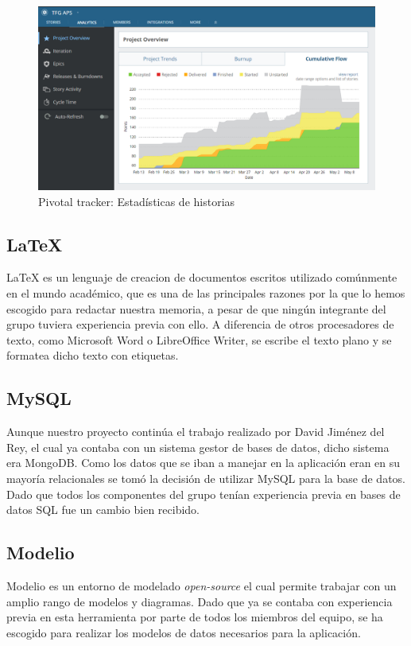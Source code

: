 \documentclass[11pt]{article}
\begin{document}
	\begin{figure}
	\centering
	\includegraphics[scale=0.6]{pivotal}
	\caption{Pivotal tracker: Estadísticas de historias}
	\label{Figura 2}
	\end{figure}
	
	\subsection{LaTeX}
LaTeX es un lenguaje de creacion de documentos escritos utilizado comúnmente en el mundo académico, que es una de las principales razones por la que lo hemos escogido para redactar nuestra memoria, a pesar de que ningún integrante del grupo tuviera experiencia previa con ello. A diferencia de otros procesadores de texto, como Microsoft Word o LibreOffice Writer, se escribe el texto plano y se formatea dicho texto con etiquetas. 
	
	\subsection{MySQL}
Aunque nuestro proyecto continúa el trabajo realizado por David Jiménez del Rey, el cual ya contaba con un sistema gestor de bases de datos, dicho sistema era MongoDB. Como los datos que se iban a manejar en la aplicación eran en su mayoría relacionales se tomó la decisión de utilizar MySQL para la base de datos. Dado que todos los componentes del grupo tenían experiencia previa en bases de datos SQL fue un cambio bien recibido.

	\subsection{Modelio}	
Modelio es un entorno de modelado \emph{open-source} el cual permite trabajar con un amplio rango de modelos y diagramas. Dado que ya se contaba con experiencia previa en esta herramienta por parte de todos los miembros del equipo, se ha escogido para realizar los modelos de datos necesarios para la aplicación.
	
\end{document}
